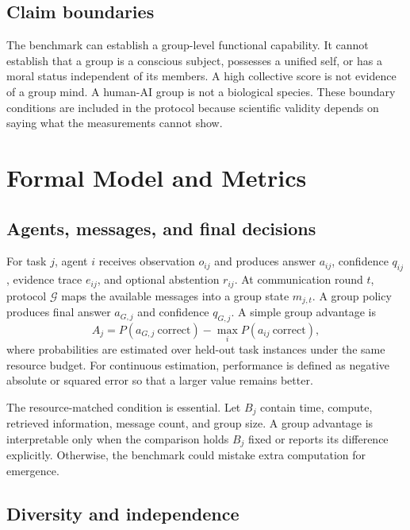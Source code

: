 \documentclass[conference]{IEEEtran}
\begin{document}
\subsection{Claim boundaries}

The benchmark can establish a group-level functional capability. It cannot establish that a group is a conscious subject, possesses a unified self, or has a moral status independent of its members. A high collective score is not evidence of a group mind. A human-AI group is not a biological species. These boundary conditions are included in the protocol because scientific validity depends on saying what the measurements cannot show.

\section{Formal Model and Metrics}

\subsection{Agents, messages, and final decisions}

For task $j$, agent $i$ receives observation $o_{ij}$ and produces answer $a_{ij}$, confidence $q_{ij}$, evidence trace $e_{ij}$, and optional abstention $r_{ij}$. At communication round $t$, protocol $\mathcal{G}$ maps the available messages into a group state $m_{j,t}$. A group policy produces final answer $a_{G,j}$ and confidence $q_{G,j}$. A simple group advantage is
\begin{equation}
A_j=P(a_{G,j}\ \mathrm{correct})-\max_i P(a_{ij}\ \mathrm{correct}),
\label{eq:advantage}
\end{equation}
where probabilities are estimated over held-out task instances under the same resource budget. For continuous estimation, performance is defined as negative absolute or squared error so that a larger value remains better.

The resource-matched condition is essential. Let $B_j$ contain time, compute, retrieved information, message count, and group size. A group advantage is interpretable only when the comparison holds $B_j$ fixed or reports its difference explicitly. Otherwise, the benchmark could mistake extra computation for emergence.

\subsection{Diversity and independence}
\end{document}
